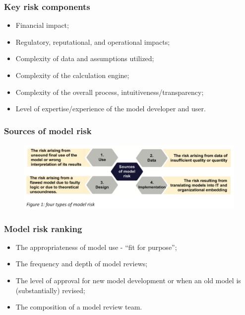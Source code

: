\documentclass[11pt]{beamer}
\begin{document}
\begin{frame}
\frametitle{Key risk components}
\begin{itemize}
	\item Financial impact;
	\item Regulatory, reputational, and operational impacts;
	\item Complexity of data and assumptions utilized;
	\item Complexity of the calculation engine;
	\item Complexity of the overall process, intuitiveness/transparency;
	\item Level of expertise/experience of the model developer and user.
\end{itemize}
\end{frame}


\begin{frame}
\frametitle{Sources of model risk}
\begin{figure}[h]
\centering
\includegraphics[scale=.35]{images/sources_of_model_risk}
\end{figure}
\end{frame}


\begin{frame}
\frametitle{Model risk ranking}
\begin{itemize}
\item The appropriateness of model use - “fit for purpose”;
\item The frequency and depth of model reviews;
\item The level of approval for new model development or when an old model is (substantially) revised;
\item The composition of a model review team.
\end{itemize}
\end{frame}
\end{document}
